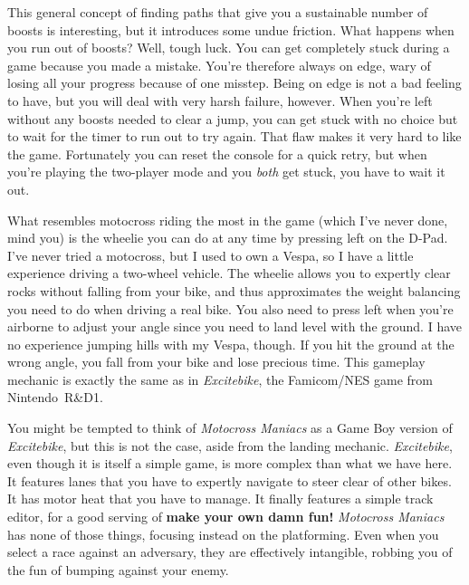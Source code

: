 \documentclass{book}
\begin{document}
This general concept of finding paths that give you a sustainable number of boosts is interesting, but it introduces some undue friction. What happens when you run out of boosts? Well, tough luck. You can get completely stuck during a game because you made a mistake. You’re therefore always on edge, wary of losing all your progress because of one misstep. Being on edge is not a bad feeling to have, but you will deal with very harsh failure, however. When you’re left without any boosts needed to clear a jump, you can get stuck with no choice but to wait for the timer to run out to try again. That flaw makes it very hard to like the game. Fortunately you can reset the console for a quick retry, but when you’re playing the two-player mode and you \emph{both} get stuck, you have to wait it out.\par
What resembles motocross riding the most in the game (which I’ve never done, mind you) is the wheelie you can do at any time by pressing left on the D-Pad. I’ve never tried a motocross, but I used to own a Vespa, so I have a little experience driving a two-wheel vehicle. The wheelie allows you to expertly clear rocks without falling from your bike, and thus approximates the weight balancing you need to do when driving a real bike. You also need to press left when you’re airborne to adjust your angle since you need to land level with the ground. I have no experience jumping hills with my Vespa, though. If you hit the ground at the wrong angle, you fall from your bike and lose precious time. This gameplay mechanic is exactly the same as in \emph{Excitebike}, the Famicom/NES game from Nintendo~R\&D1.\par
\FloatBarrier\vspace{\baselineskip}\begin{figure}[H]\end{figure}
You might be tempted to think of \emph{Motocross Maniacs} as a Game Boy version of \emph{Excitebike}, but this is not the case, aside from the landing mechanic. \emph{Excitebike}, even though it is itself a simple game, is more complex than what we have here. It features lanes that you have to expertly navigate to steer clear of other bikes. It has motor heat that you have to manage. It finally features a simple track editor, for a good serving of \textbf{make your own damn fun!} \emph{Motocross Maniacs} has none of those things, focusing instead on the platforming. Even when you select a race against an adversary, they are effectively intangible, robbing you of the fun of bumping against your enemy.\par
\end{document}
